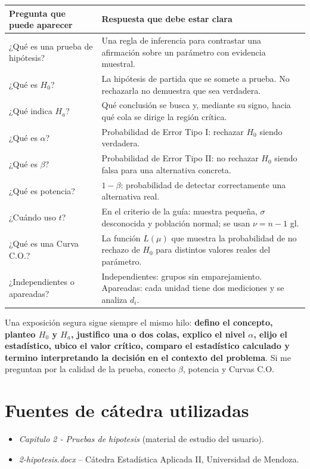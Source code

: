 \documentclass[11pt,a4paper]{article}
\begin{document}
\begin{table}[H]
\centering
\small
\begin{tabularx}{\textwidth}{p{3.4cm}X}
\toprule
Pregunta que puede aparecer & Respuesta que debe estar clara \\
\midrule
¿Qué es una prueba de hipótesis? & Una regla de inferencia para contrastar una afirmación sobre un parámetro con evidencia muestral.\\
¿Qué es $H_0$? & La hipótesis de partida que se somete a prueba. No rechazarla no demuestra que sea verdadera.\\
¿Qué indica $H_a$? & Qué conclusión se busca y, mediante su signo, hacia qué cola se dirige la región crítica.\\
¿Qué es $\alpha$? & Probabilidad de Error Tipo I: rechazar $H_0$ siendo verdadera.\\
¿Qué es $\beta$? & Probabilidad de Error Tipo II: no rechazar $H_0$ siendo falsa para una alternativa concreta.\\
¿Qué es potencia? & $1-\beta$: probabilidad de detectar correctamente una alternativa real.\\
¿Cuándo uso $t$? & En el criterio de la guía: muestra pequeña, $\sigma$ desconocida y población normal; se usan $\nu=n-1$ gl.\\
¿Qué es una Curva C.O.? & La función $L(\mu)$ que muestra la probabilidad de no rechazo de $H_0$ para distintos valores reales del parámetro.\\
¿Independientes o apareadas? & Independientes: grupos sin emparejamiento. Apareadas: cada unidad tiene dos mediciones y se analiza $d_i$.\\
\bottomrule
\end{tabularx}
\end{table}

\begin{oral}
Una exposición segura sigue siempre el mismo hilo: \textbf{defino el concepto, planteo $H_0$ y $H_a$, justifico una o dos colas, explico el nivel $\alpha$, elijo el estadístico, ubico el valor crítico, comparo el estadístico calculado y termino interpretando la decisión en el contexto del problema}. Si me preguntan por la calidad de la prueba, conecto $\beta$, potencia y Curvas C.O.
\end{oral}

\section*{Fuentes de cátedra utilizadas}
\begin{itemize}
\item \textit{Capitulo 2 - Pruebas de hipotesis} (material de estudio del usuario).
\item \textit{2-hipotesis.docx} -- Cátedra Estadística Aplicada II, Universidad de Mendoza.
\end{itemize}
\end{document}
